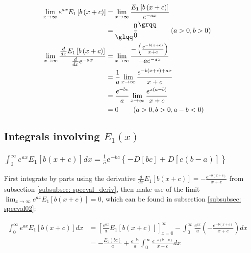 \documentclass[bibliography=totocnumbered]{scrartcl}
\begin{document}
	\begin{align}
		\lim_{x\rightarrow\infty}e^{ax}E_1\left[b\left(x+c\right)\right]&=\lim_{x\rightarrow\infty}\frac{E_1\left[b\left(x+c\right)\right]}{e^{-ax}}\\
		&=\text{\raisebox{-9pt}{\glqq}}\frac{0}{0}\text{\raisebox{9pt}{\grqq}}\qquad\left(a>0, b>0\right)\\
		\lim_{x\rightarrow\infty}\frac{\frac{d}{dx}E_1\left[b\left(x+c\right)\right]}{\frac{d}{dx}e^{-ax}}&=\lim_{x\rightarrow\infty}\frac{-\left(\frac{e^{-b\left(x+c\right)}}{x+c}\right)}{-ae^{-ax}}\\
		&=\frac{1}{a}\lim_{x\rightarrow\infty}\frac{e^{-b\left(x+c\right)+ax}}{x+c}\\
		&=\frac{e^{-bc}}{a}\lim_{x\rightarrow\infty}\frac{e^{x\left(a-b\right)}}{x+c}\\
		&=0\qquad\left(a>0, b>0, a-b<0\right)
	\end{align}
	

	\subsection[Integrals involving E1(x)]{Integrals involving $E_1\left(x\right)$}
	
	\subsubsection[A integral of E1 with exponential function]{$\int_{0}^{\infty}e^{ax}E_1\left[b\left(x+c\right)\right]dx=\frac{1}{a}e^{-bc}\left\{-D\left[bc\right]+D\left[c\left(b-a\right)\right]\right\}$}
	
	
	First integrate by parts using the derivative $\frac{d}{dx}E_1\left[b\left(x+c\right)\right]=-\frac{e^{-b\left(x+c\right)}}{x+c}$ from subsection \ref{subsubsec: specval_deriv}, then make use of the limit $\lim_{x\rightarrow\infty}e^{ax}E_1\left[b\left(x+c\right)\right]=0$, which can be found in subsection \ref{subsubsec: specval02}:
	
	\begin{align}
		\int_{0}^{\infty}e^{ax}E_1\left[b\left(x+c\right)\right]dx&=\left[\frac{e^{ax}}{a}E_1\left[b\left(x+c\right)\right]\right]^{\infty}_{x=0}-\int_{0}^{\infty}\frac{e^{ax}}{a}\left(-\frac{e^{-b\left(x+c\right)}}{x+c}\right)dx\\
		&=-\frac{E_1\left(bc\right)}{a}+\frac{e^{-bc}}{a}\int_{0}^{\infty}\frac{e^{-x\left(b-a\right)}}{x+c}dx
	\end{align}
	
\end{document}
